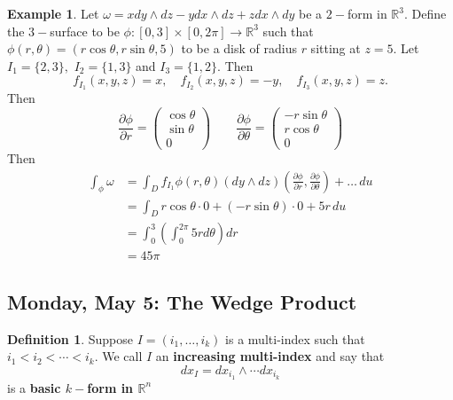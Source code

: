 \documentclass[10pt, oneside]{article}
\newcommand{\bbR}{\mathbb{R}}
\theoremstyle{definition}
\newtheorem{exmp}{Example}[section]
\newtheorem{defn}{Definition}
\begin{document}
\begin{exmp}
    Let $\omega = x dy \wedge dz - y dx \wedge dz + zdx \wedge dy$ be a $2-$form in $\bbR^3.$ Define the $3-$surface to be $\phi:[0,3] \times [0,2\pi] \to \bbR^3$ such that $\phi(r,\theta) = (r\cos \theta, r\sin \theta, 5)$ to be a disk of radius $r$ sitting at $z = 5.$ Let $I_1 = \{2,3\},$ $I_2 = \{1,3\}$ and $I_3 = \{1,2\}.$ Then 
    \[f_{I_1}(x,y,z) = x, \quad f_{I_2}(x,y,z) = -y, \quad f_{I_3}(x,y,z) = z.\] Then 
    \[\frac{\partial \phi}{\partial r} = \begin{pmatrix}
        \cos\theta\\
        \sin \theta\\
        0
    \end{pmatrix}\qquad \frac{\partial \phi}{\partial \theta} = \begin{pmatrix}
        -r\sin \theta\\
        r\cos \theta\\
        0
    \end{pmatrix}\] Then 
    \begin{align*}
        \int_\phi \omega &= \int_D f_{I_1}\phi(r,\theta)(dy \wedge dz)(\frac{\partial \phi}{\partial r}, \frac{\partial \phi}{\partial \theta}) + \dots \,du\\
        &= \int_D r\cos\theta\cdot 0 + (-r\sin \theta)\cdot 0+ 5r\, du\\
        &= \int_0^{3}\left(\int_0^{2\pi} 5r d\theta\right) dr\\
        &= 45 \pi
    \end{align*}
\end{exmp}


\newpage
\subsection{Monday, May 5: The Wedge Product}

\begin{defn}
    Suppose $I = (i_1, \dots, i_k)$ is a multi-index such that $i_1 < i_2< \cdots < i_k.$ We call $I$ an \textbf{increasing multi-index} and say that 
    \[dx_I =dx_{i_1} \wedge \cdots dx_{i_k}\] is a \textbf{basic $k-$form in $\bbR^n$}
\end{defn}
\end{document}
